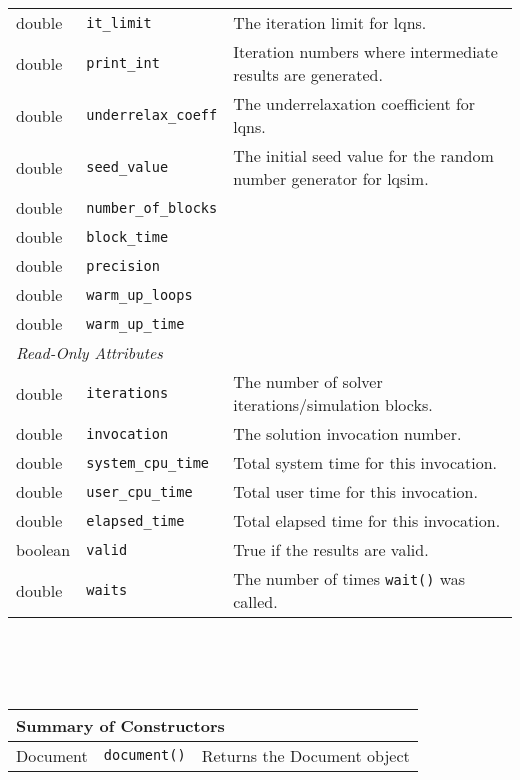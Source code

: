 \begin{tabular}{|p{1.0in}|p{2.3in}||p{2.8in}|}
  double &  {\tt it\_limit} & The iteration limit for lqns.\\
  double &  {\tt print\_int} & Iteration numbers where intermediate results are generated.\\
  double &  {\tt underrelax\_coeff} & The underrelaxation coefficient for lqns.\\
  double &  {\tt seed\_value} & The initial seed value for the random number generator for lqsim.\\
  double &  {\tt number\_of\_blocks} & \\
  double &  {\tt block\_time} & \\
  double &  {\tt precision} & \\
  double &  {\tt warm\_up\_loops} & \\
  double &  {\tt warm\_up\_time} & \\
  \hline
  \hline
  \multicolumn{3}{|l|}{\emph{Read-Only Attributes}}\\
  \hline
  double &  {\tt iterations} & The number of solver iterations/simulation blocks.\\
  double &  {\tt invocation} & The solution invocation number.\\
  double &  {\tt system\_cpu\_time} & Total system time for this invocation.\\
  double &  {\tt user\_cpu\_time} & Total user time for this invocation.\\
  double &  {\tt elapsed\_time} & Total elapsed time for this invocation.\\
  boolean & {\tt valid} & True if the results are valid.\\
  double &  {\tt waits} & The number of times \texttt{wait()} was called.\\
  \hline
\end{tabular}
\\\\\ \\
\begin{tabular}{|p{1.0in}|p{2.3in}||p{2.8in}|}
  \hline
  \multicolumn{3}{|l|}{\textbf{Summary of Constructors}}\\
  \hline
  Document & {\tt document()} & Returns the Document object\\
  \hline
\end{tabular}

